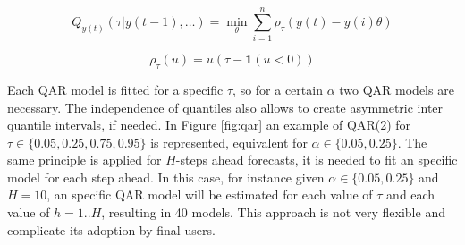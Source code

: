 \begin{equation}
Q_{y(t)}(\tau | y(t-1),\ldots) = \min_\theta \sum_{i=1}^n \rho_\tau (y(t) - y(i)\theta)    
\label{eqn:qar}
\end{equation}

\begin{equation}
    \rho_\tau(u) = u(\tau - \mathbf{1}(u < 0))
    \label{eqn:pinball}
\end{equation}

Each QAR model is fitted for a specific $\tau$, so for a certain $\alpha$ two QAR models are necessary. The independence of quantiles  also allows to create asymmetric inter quantile intervals, if needed. In Figure \ref{fig:qar} an example of QAR(2) for $\tau \in \{0.05,0.25,0.75,0.95\}$ is represented, equivalent for $\alpha \in \{0.05,0.25\}$.  The same principle is applied for $H$-steps ahead forecasts, it is needed to fit an specific model for each step ahead. In this case, for instance given $\alpha \in \{0.05,0.25\}$ and $H=10$, an specific QAR model will be estimated for each value of $\tau$ and each value of $h=1..H$, resulting in 40 models. This approach is not very flexible and complicate its adoption by final users.

